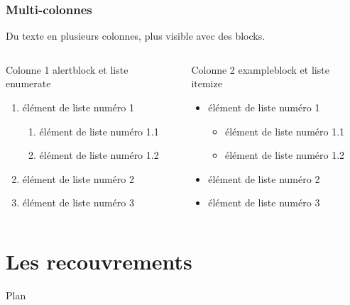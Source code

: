 \documentclass[slidetop,11pt]{beamer}
\begin{document}
\begin{frame}
\frametitle{Multi-colonnes}
Du texte en plusieurs colonnes, plus visible avec des blocks.

\bigskip
  \begin{columns}[t]
  \begin{column}{5cm}
  \begin{alertblock}{Colonne 1}
  alertblock et liste enumerate
\begin{enumerate}
    \item élément de liste numéro 1
      \begin{enumerate}
      \item élément de liste numéro 1.1
      \item élément de liste numéro 1.2
      \end{enumerate}
    \item élément de liste numéro 2
    \item élément de liste numéro 3 
  \end{enumerate}
  \end{alertblock} 
  \end{column}
  
  \begin{column}{5cm}
  \begin{exampleblock}{Colonne 2}
  exampleblock et liste itemize
\begin{itemize}
    \item élément de liste numéro 1
      \begin{itemize}
      \item élément de liste numéro 1.1
      \item élément de liste numéro 1.2
      \end{itemize}
    \item élément de liste numéro 2
    \item élément de liste numéro 3 
  \end{itemize}
  \end{exampleblock}   
  \end{column}
  \end{columns}  
\end{frame}

\section{Les recouvrements}
\begin{frame}{Plan}
  \small {}
\end{frame}
\end{document}
